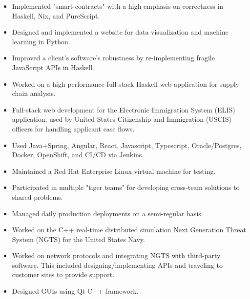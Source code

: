 \documentclass[10pt,a4paper,ragged2e,withhyper]{altacv}
\begin{document}
\begin{paracol}{2}
\divider


\begin{itemize}
    \item Implemented "smart-contracts" with a high emphasis on correctness in Haskell, Nix, and PureScript.
    \item Designed and implemented a website for data visualization and machine learning in Python.
    \item Improved a client's software's robustness by re-implementing fragile JavaScript APIs in Haskell.
    \item Worked on a high-performance full-stack Haskell web application for supply-chain analysis.
\end{itemize}

\divider


\begin{itemize}
    \item Full-stack web development for the Electronic Immigration System (ELIS) application, used by United States Citizenship and Immigration (USCIS) officers for handling applicant case flows.
    \item Used Java+Spring, Angular, React, Javascript, Typescript, Oracle/Postgres, Docker, OpenShift, and CI/CD via Jenkins.
    \item Maintained a Red Hat Enterprise Linux virtual machine for testing.
    \item Participated in multiple "tiger teams" for developing cross-team solutions to shared problems.
    \item Managed daily production deployments on a semi-regular basis.
\end{itemize}

\divider

\begin{itemize}
  \item Worked on the C++ real-time distributed simulation Next Generation Threat System (NGTS) for the United States Navy.
  \item Worked on network protocols and integrating NGTS with third-party software. This included designing/implementing APIs and traveling to customer sites to provide support.
  \item Designed GUIs using Qt C++ framework.
\end{itemize}




\end{paracol}
\end{document}
